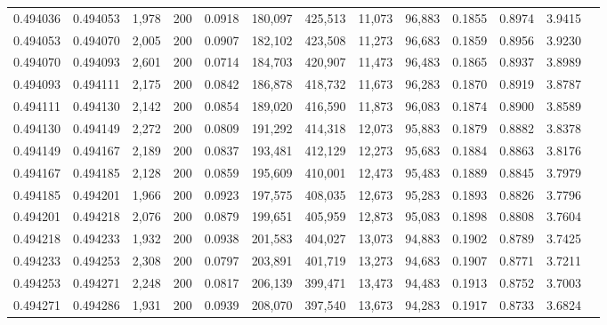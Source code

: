 \begin{tabular}{rrrrrrrrrrrrr}
0.494036 & 0.494053 & 1,978 & 200 &                                     0.0918 & 180,097 & 425,513 &  11,073 &  96,883 & 0.1855 & 0.8974 & 3.9415 \\
0.494053 & 0.494070 & 2,005 & 200 &                                     0.0907 & 182,102 & 423,508 &  11,273 &  96,683 & 0.1859 & 0.8956 & 3.9230 \\
0.494070 & 0.494093 & 2,601 & 200 &                                     0.0714 & 184,703 & 420,907 &  11,473 &  96,483 & 0.1865 & 0.8937 & 3.8989 \\
0.494093 & 0.494111 & 2,175 & 200 &                                     0.0842 & 186,878 & 418,732 &  11,673 &  96,283 & 0.1870 & 0.8919 & 3.8787 \\
0.494111 & 0.494130 & 2,142 & 200 &                                     0.0854 & 189,020 & 416,590 &  11,873 &  96,083 & 0.1874 & 0.8900 & 3.8589 \\
0.494130 & 0.494149 & 2,272 & 200 &                                     0.0809 & 191,292 & 414,318 &  12,073 &  95,883 & 0.1879 & 0.8882 & 3.8378 \\
0.494149 & 0.494167 & 2,189 & 200 &                                     0.0837 & 193,481 & 412,129 &  12,273 &  95,683 & 0.1884 & 0.8863 & 3.8176 \\
0.494167 & 0.494185 & 2,128 & 200 &                                     0.0859 & 195,609 & 410,001 &  12,473 &  95,483 & 0.1889 & 0.8845 & 3.7979 \\
0.494185 & 0.494201 & 1,966 & 200 &                                     0.0923 & 197,575 & 408,035 &  12,673 &  95,283 & 0.1893 & 0.8826 & 3.7796 \\
0.494201 & 0.494218 & 2,076 & 200 &                                     0.0879 & 199,651 & 405,959 &  12,873 &  95,083 & 0.1898 & 0.8808 & 3.7604 \\
0.494218 & 0.494233 & 1,932 & 200 &                                     0.0938 & 201,583 & 404,027 &  13,073 &  94,883 & 0.1902 & 0.8789 & 3.7425 \\
0.494233 & 0.494253 & 2,308 & 200 &                                     0.0797 & 203,891 & 401,719 &  13,273 &  94,683 & 0.1907 & 0.8771 & 3.7211 \\
0.494253 & 0.494271 & 2,248 & 200 &                                     0.0817 & 206,139 & 399,471 &  13,473 &  94,483 & 0.1913 & 0.8752 & 3.7003 \\
0.494271 & 0.494286 & 1,931 & 200 &                                     0.0939 & 208,070 & 397,540 &  13,673 &  94,283 & 0.1917 & 0.8733 & 3.6824 \\

\end{tabular}
